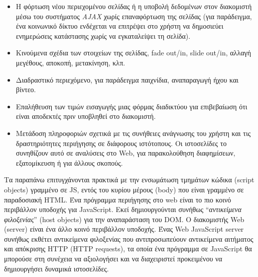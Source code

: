 \begin{itemize}
\item Η φόρτωση νέου περιεχομένου σελίδας ή η υποβολή δεδομένων στον διακομιστή μέσω του συστήματος \textit{AJAX} χωρίς επαναφόρτωση της σελίδας (για παράδειγμα, ένα κοινωνικό δίκτυο ενδέχεται να επιτρέψει στο χρήστη να δημοσιεύει ενημερώσεις κατάστασης χωρίς να εγκαταλείψει τη σελίδα).
\item Κινούμενα σχέδια των στοιχείων της σελίδας, fade out/in, slide out/in, αλλαγή μεγέθους, αποκοπή, μετακίνηση, κλπ.
\item Διαδραστικό περιεχόμενο, για παράδειγμα παιχνίδια, αναπαραγωγή ήχου και βίντεο.
\item Επαλήθευση των τιμών εισαγωγής μιας φόρμας διαδικτύου για επιβεβαίωση ότι είναι αποδεκτές πριν υποβληθεί στο διακομιστή.
\item Μετάδοση πληροφοριών σχετικά με τις συνήθειες ανάγνωσης του χρήστη και τις δραστηριότητες περιήγησης σε διάφορους ιστότοπους. Οι ιστοσελίδες το συνηθίζουν αυτό σε αναλύσεις στο Web, για παρακολούθηση διαφημίσεων, εξατομίκευση ή για άλλους σκοπούς.
\end{itemize}

Τα παραπάνω επιτυγχάνονται πρακτικά με την ενσωμάτωση τμημάτων κώδικα (script objects) γραμμένο σε JS, εντός του κυρίου μέρους (body) που είναι γραμμένο σε παραδοσιακή HTML. Ένα πρόγραμμα περιήγησης στο web είναι το πιο κοινό περιβάλλον υποδοχής για JavaScript. Εκεί δημιουργούνται συνήθως ``\textit{αντικείμενα φιλοξενίας}'' (host objects) για την αναπαράσταση του DOM. Ο διακομιστής  Web (server) είναι ένα άλλο κοινό περιβάλλον υποδοχής. Ένας Web JavaScript server συνήθως εκθέτει αντικείμενα φιλοξενίας που αντιπροσωπεύουν αντικείμενα αιτήματος και απόκρισης HTTP (HTTP requests), τα οποία ένα πρόγραμμα σε JavaScript θα μπορούσε στη συνέχεια να αξιολογήσει και να διαχειριστεί προκειμένου να δημιουργήσει δυναμικά ιστοσελίδες. 

